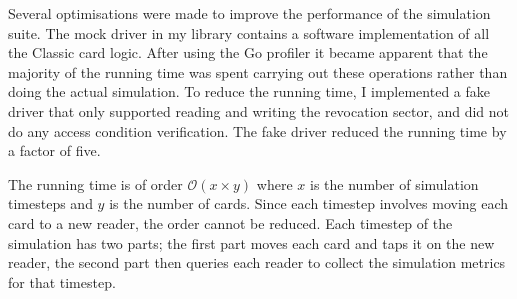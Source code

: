 \documentclass[dissertation.tex]{subfiles}
\begin{document}
  Several optimisations were made to improve the performance of the simulation suite. The mock driver in my \mifare{} library contains a software implementation of all the \mifare{} Classic card logic. After using the Go profiler it became apparent that the majority of the running time was spent carrying out these operations rather than doing the actual simulation. To reduce the running time, I implemented a fake driver that only supported reading and writing the revocation sector, and did not do any access condition verification. The fake driver reduced the running time by a factor of five.

  The running time is of order $\mathcal{O}(x \times y)$ where $x$ is the number of simulation timesteps and $y$ is the number of cards. Since each timestep involves moving each card to a new reader, the order cannot be reduced. Each timestep of the simulation has two parts; the first part moves each card and taps it on the new reader, the second part then queries each reader to collect the simulation metrics for that timestep.




\end{document}

